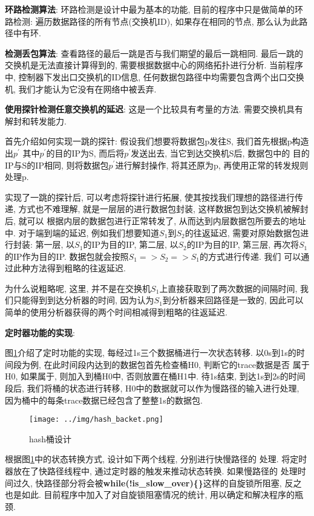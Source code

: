 \textbf{环路检测算法}: 环路检测是设计中最为基本的功能, 目前的程序中只是做简单的环路检测:
 遍历数据路径的所有节点(交换机ID), 如果存在相同的节点, 那么认为此路径中有环.

\textbf{检测丢包算法}: 查看路径的最后一跳是否与我们期望的最后一跳相同.
最后一跳的交换机是无法直接计算得到的, 需要根据数据中心的网络拓扑进行分析.
当前程序中, 控制器下发出口交换机的ID信息,
任何数据包路径中均需要包含两个出口交换机, 我们才能认为它没有在网络中被丢弃.


\textbf{使用探针检测任意交换机的延迟}: 这是一个比较具有考量的方法.
需要交换机具有解封和转发能力.

首先介绍如何实现一跳的探针: 假设我们想要将数据包p发往S,
我们首先根据p构造出\(p^{'}\) 其中\(p^{'}\)的目的IP为S,
而后将\(p^{'}\)发送出去, 当它到达交换机S后, 数据包中的
目的IP与S的IP相同, 则将数据包\(p^{'}\)进行解封操作, 将其还原为p,
再使用正常的转发规则处理p.

实现了一跳的探针后, 可以考虑将探针进行拓展,
使其按找我们理想的路径进行传递, 方式也不难理解,
就是一层层的进行数据包封装, 这样数据包到达交换机被解封后, 就可以
根据内层的数据包进行正常转发了, 从而达到内层数据包所要去的地址中.
对于端到端的延迟, 例如我们想要知道\(S_{1}\)到\(S_{2}\)的往返延迟,
需要对原始数据包进行封装: 第一层, 以\(S_{1}\)的IP为目的IP, 第二层,
以\(S_{2}\)的IP为目的IP, 第三层, 再次将\(S_{1}\) 的IP作为目的IP.
数据包就会按照\(S_{1} => S_{2} => S_{1}\)的方式进行传递. 我们
可以通过此种方法得到粗略的往返延迟.

为什么说粗略呢, 这里,
并不是在交换机\(S_{1}\)上直接获取到了两次数据的间隔时间,
我们只能得到到达分析器的时间, 因为认为\(S_{1}\)到分析器来回路径是一致的,
因此可以 简单的使用分析器获得的两个时间相减得到粗略的往返延迟.

\textbf{定时器功能的实现}:

图\ref{fig:hash_backet}介绍了定时功能的实现, 每经过1s三个数据桶进行一次状态转移.
以0s到1s的时间段为例, 在此时间段内达到的数据包首先检查桶H0, 判断它的trace数据是否
属于H0, 如果属于, 则加入到桶H0中, 否则放置在桶H1中. 待1s结束, 到达1s到2s的时间段后,
我们将桶的状态进行转移, H0中的数据就可以作为慢路径的输入进行处理,
因为桶中的每条trace数据已经包含了整整1s的数据包.

\begin{figure}[htbp!]
  \centering
  \texttt{[image: ../img/hash\_backet.png]}
  \caption{hash桶设计}
  \label{fig:hash_backet}
\end{figure}


  根据图\ref{fig:hash_backet}中的状态转换方式, 设计如下两个线程, 分别进行快慢路径的
处理. 将定时器放在了快路径线程中, 通过定时器的触发来推动状态转换. 如果慢路径的
处理时间过久, 快路径部分将会被\textbf{while(!is\_slow\_over)\{\}}这样的自旋锁所阻塞,
反之也是如此. 目前程序中加入了对自旋锁阻塞情况的统计, 用以确定和解决程序的瓶颈.

